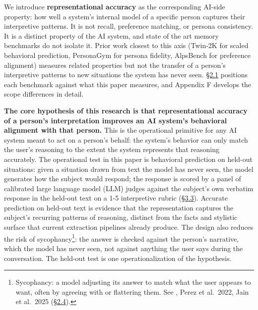 We introduce \textbf{representational accuracy} as the corresponding
AI-side property: how well a system's internal model of a specific
person captures their interpretive patterns. It is not recall,
preference matching, or persona consistency. It is a distinct property
of the AI system, and state of the art memory benchmarks do not isolate
it. Prior work closest to this axis (Twin-2K for scaled behavioral
prediction, PersonaGym for persona fidelity, AlpsBench for preference
alignment) measures related properties but not the transfer of a
person's interpretive patterns to new situations the system has never
seen. \hyperref[prior-measurement-targets-and-the-gap-representational-accuracy-fills]{§2.1} positions each benchmark against what this paper measures,
and Appendix F develops the scope differences in detail.

\textbf{The core hypothesis of this research is that representational
accuracy of a person's interpretation improves an AI system's behavioral
alignment with that person.} This is the operational primitive for any
AI system meant to act on a person's behalf: the system's behavior can
only match the user's reasoning to the extent the system represents that
reasoning accurately. The operational test in this paper is behavioral
prediction on held-out situations: given a situation drawn from text the
model has never seen, the model generates how the subject would respond;
the response is scored by a panel of calibrated large language model
(LLM) judges against the subject's own verbatim response in the held-out
text on a 1-5 interpretive rubric (\hyperref[scoring-rubric-with-calibrated-llm-judge-panel]{§3.3}). Accurate prediction on
held-out text is evidence that the representation captures the subject's
recurring patterns of reasoning, distinct from the facts and stylistic
surface that current extraction pipelines already produce. The design
also reduces the risk of sycophancy\footnote{Sycophancy: a model
  adjusting its answer to match what the user appears to want, often by
  agreeing with or flattering them. See \citet{sharma2023sycophancy}, Perez et
  al.~2022, Jain et al.~2025 (\hyperref[cognitive-and-representational-foundations]{§2.4}).}: the answer is checked against the
person's narrative, which the model has never seen, not against anything
the user says during the conversation. The held-out test is one
operationalization of the hypothesis.

